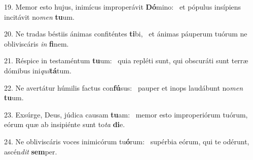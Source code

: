 19. Memor esto hujus, inimícus improperávit \textbf{Dó}mino: \ast\  et pópulus insípiens incitávit no\textit{men} \textbf{tu}um.\

20. Ne tradas béstiis ánimas confiténtes \textbf{ti}bi, \ast\  et ánimas páuperum tuórum ne obliviscáris \textit{in} \textbf{fi}nem.\

21. Réspice in testaméntum \textbf{tu}um: \ast\  quia repléti sunt, qui obscuráti sunt terræ dómibus ini\textit{qui}\textbf{tá}tum.\

22. Ne avertátur húmilis factus con\textbf{fú}sus: \ast\  pauper et inops laudábunt no\textit{men} \textbf{tu}um.\

23. Exsúrge, Deus, júdica causam \textbf{tu}am: \ast\  memor esto improperiórum tuórum, eórum quæ ab insipiénte sunt to\textit{ta} \textbf{di}e.\

24. Ne obliviscáris voces inimicórum tu\textbf{ó}rum: \ast\  supérbia eórum, qui te odérunt, ascén\textit{dit} \textbf{sem}per.\


